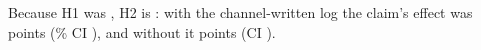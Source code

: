 Because H1 was \wtthHaikuHOneVerdictText, H2 is \wtthHaikuHTwoVerdictText: with the channel-written log the claim's effect was \wtthHaikuHTwoDeltaROne{} points (\wtthProtocolLevel\% CI \wtthHaikuHTwoDeltaROneCI), and without it \wtthHaikuHTwoDeltaRZero{} points (CI \wtthHaikuHTwoDeltaRZeroCI).
